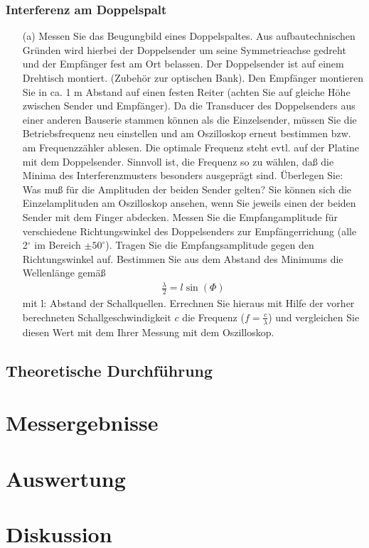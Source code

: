 \documentclass[12pt]{scrartcl}
\begin{document}
\subsubsection{Interferenz am Doppelspalt}
\begin{itemize}
\item[(a)]
Messen Sie das Beugungbild eines Doppelspaltes. Aus aufbautechnischen Gründen wird hierbei der Doppelsender um seine Symmetrieachse gedreht und der Empfänger fest am Ort belassen. Der Doppelsender ist auf einem Drehtisch montiert. (Zubehör zur optischen Bank). Den Empfänger montieren Sie
in ca. 1 m Abstand auf einen festen Reiter (achten Sie auf gleiche Höhe zwischen Sender und Empfänger). Da die Transducer des Doppelsenders aus einer anderen Bauserie stammen können als die Einzelsender, müssen Sie die Betriebsfrequenz neu einstellen und am Oszilloskop erneut bestimmen bzw. am Frequenzzähler ablesen. Die optimale Frequenz steht evtl. auf der Platine mit dem Doppelsender. Sinnvoll ist, die Frequenz so zu wählen, daß die Minima des Interferenzmusters
besonders ausgeprägt sind. Überlegen Sie: Was muß für die Amplituden der beiden Sender gelten? Sie können sich die Einzelamplituden am Oszilloskop ansehen, wenn Sie jeweils einen der beiden Sender mit dem Finger abdecken.
Messen Sie die Empfangamplitude für verschiedene Richtungswinkel des Doppelsenders zur Empfängerrichung (alle 2$^{\circ}$ im Bereich $\pm 50^{\circ}$). Tragen Sie die Empfangsamplitude gegen den Richtungswinkel auf. Bestimmen Sie aus dem Abstand des Minimums die Wellenlänge gemäß
\begin{align}
\frac{\lambda}{2} = l\sin(\Phi)
\end{align}
mit l: Abstand der Schallquellen.
Errechnen Sie hieraus mit Hilfe der vorher berechneten Schallgeschwindigkeit $c$ die Frequenz ($f = \frac{c}{\lambda}$) und vergleichen Sie diesen Wert mit dem Ihrer Messung mit dem Oszilloskop.
\end{itemize}
\subsection{Theoretische Durchführung}


\section{Messergebnisse}



\section{Auswertung}


\section{Diskussion}


\end{document}
